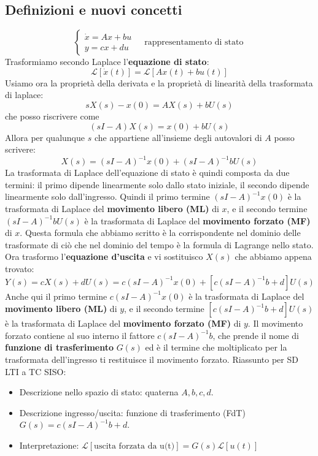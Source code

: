 \subsection{Definizioni e nuovi concetti}
\[
    \begin{cases}
        \dot{x} = Ax + bu\\
        y = cx + du
    \end{cases} \;\;\;\; \text{rappresentamento di stato}\;
\]
\newline
Trasformiamo secondo Laplace l'\textbf{equazione di stato}:
\[
    \mathcal{L}[\dot{x}(t)] = \mathcal{L}[Ax(t) + bu(t)]
\]
Usiamo ora la proprietà della derivata e la proprietà di linearità della trasformata di laplace:
\[
    sX(s)-x(0) = AX(s) + bU(s)
\]
che posso riscrivere come
\[
    (sI-A)X(s) = x(0) + bU(s)
\]
Allora per qualunque $s$ che appartiene all'insieme degli autovalori di $A$ posso scrivere:
\[
    X(s) = (sI-A)^{-1} x(0) + (sI-A)^{-1} bU(s)
\]
La trasformata di Laplace dell'equazione di stato è quindi composta da due termini: il primo dipende linearmente solo dallo stato iniziale, il secondo dipende linearmente solo dall'ingresso. Quindi il primo termine $(sI-A)^{-1} x(0)$ è la trasformata di Laplace del \textbf{movimento libero (ML)} di $x$, e il secondo termine $(sI-A)^{-1} bU(s)$ è la trasformata di Laplace del \textbf{movimento forzato (MF)} di $x$.\newline
Questa formula che abbiamo scritto è la corrispondente nel dominio delle trasformate di ciò che nel dominio del tempo è la formula di Lagrange nello stato.\newline
\newline
Ora trasformo l'\textbf{equazione d'uscita} e vi sostituisco $X(s)$ che abbiamo appena trovato:
\[
    Y(s) = cX(s) + dU(s) = c(sI-A)^{-1} x(0) + [c(sI-A)^{-1} b + d]U(s)
\]
Anche qui il primo termine $c(sI-A)^{-1} x(0)$ è la trasformata di Laplace del \textbf{movimento libero (ML)} di $y$, e il secondo termine $[c(sI-A)^{-1} b + d]U(s)$ è la trasformata di Laplace del \textbf{movimento forzato (MF)} di $y$.\newline
Il movimento forzato contiene al suo interno il fattore $c(sI-A)^{-1} b$, che prende il nome di \textbf{funzione di trasferimento} $G(s)$ ed è il termine che moltiplicato per la trasformata dell'ingresso ti restituisce il movimento forzato.\newline
\newline
\newline
Riassunto per SD LTI a TC SISO:
\begin{itemize}
    \item Descrizione nello spazio di stato: quaterna $A, b, c, d$.
    \item Descrizione ingresso/uscita: funzione di trasferimento (FdT) $G(s) = c(sI-A)^{-1}b +d$.
    \item Interpretazione: $\mathcal{L}[\text{uscita forzata da u(t)}]= G(s) \mathcal{L}[u(t)]$ 
\end{itemize}
